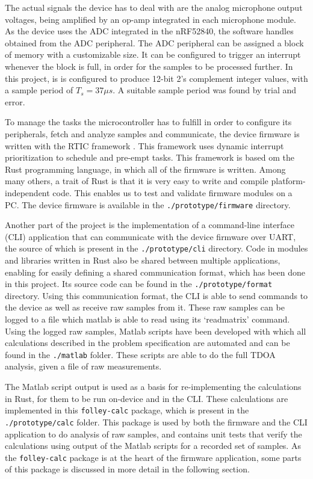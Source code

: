 \documentclass[a4paper]{article}
\newcommand{\rust}[1]{\texttt{#1}}
\begin{document}
The actual signals the device has to deal with are the analog microphone output voltages, being amplified by an op-amp integrated in each microphone module. As the device uses the ADC integrated in the nRF52840, the software handles obtained from the ADC peripheral. The ADC peripheral can be assigned a block of memory with a customizable size. It can be configured to trigger an interrupt whenever the block is full, in order for the samples to be processed further. In this project, is is configured to produce 12-bit 2's complement integer values, with a sample period of $T_s = 37 \mu s$. A suitable sample period was found by trial and error.

To manage the tasks the microcontroller has to fulfill in order to configure its peripherals, fetch and analyze samples and communicate, the device firmware is written with the RTIC framework \cite{rtic}. This framework uses dynamic interrupt prioritization to schedule and pre-empt tasks. This framework is based om the Rust programming language, in which all of the firmware is written. Among many others, a trait of Rust is that it is very easy to write and compile platform-independent code. This enables us to test and validate firmware modules on a PC. The device firmware is available in the \texttt{./prototype/firmware} directory.

Another part of the project is the implementation of a command-line interface (CLI) application that can communicate with the device firmware over UART, the source of which is present in the \texttt{./prototype/cli} directory. Code in modules and libraries written in Rust also be shared between multiple applications, enabling for easily defining a shared communication format, which has been done in this project. Its source code can be found in the \newline\texttt{./prototype/format} directory. Using this communication format, the CLI is able to send commands to the device as well as receive raw samples from it. These raw samples can be logged to a file which matlab is able to read using its `readmatrix' command. Using the logged raw samples, Matlab scripts have been developed with which all calculations described in the problem specification are automated and can be found in the \texttt{./matlab} folder. These scripts are able to do the full TDOA analysis, given a file of raw measurements.

The Matlab script output is used as a basis for re-implementing the calculations in Rust, for them to be run on-device and in the CLI. These calculations are implemented in this \rust{folley-calc} package, which is present in the \texttt{./prototype/calc} folder. This package is used by both the firmware and the CLI application to do analysis of raw samples, and contains unit tests that verify the calculations using output of the Matlab scripts for a recorded set of samples. As the \rust{folley-calc} package is at the heart of the firmware application, some parts of this package is discussed in more detail in the following section.
\end{document}
